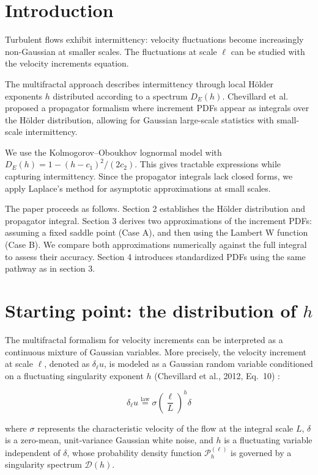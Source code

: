 \documentclass{article}
\begin{document}
\section{Introduction}

Turbulent flows exhibit intermittency: velocity fluctuations become increasingly non-Gaussian at smaller scales. The fluctuations at scale $\ell$ can be studied with the velocity increments equation.

The multifractal approach describes intermittency through local Hölder exponents $h$ distributed according to a spectrum $D_E(h)$. Chevillard et al.~\cite{chevillard2012} proposed a propagator formalism where increment PDFs appear as integrals over the Hölder distribution, allowing for Gaussian large-scale statistics with small-scale intermittency.

We use the Kolmogorov--Oboukhov lognormal model with $D_E(h) = 1 - (h-c_1)^2/(2c_2)$. This gives tractable expressions while capturing intermittency. Since the propagator integrals lack closed forms, we apply Laplace's method for asymptotic approximations at small scales.

The paper proceeds as follows. Section 2 establishes the Hölder distribution and propagator integral. Section 3 derives two approximations of the increment PDFs: assuming a fixed saddle point (Case A), and then using the Lambert W function (Case B). We compare both approximations numerically against the full integral to assess their accuracy. Section 4 introduces standardized PDFs using the same pathway as in section 3.

\section{Starting point: the distribution of $h$}

The multifractal formalism for velocity increments can be interpreted as a continuous mixture of Gaussian variables. More precisely, the velocity increment at scale $\ell$, denoted as $\delta_{\ell}u$, is modeled as a Gaussian random variable conditioned on a fluctuating singularity exponent $h$ (Chevillard et al., 2012, Eq.~10) :

\begin{equation}
\delta_{\ell}u \stackrel{\text{law}}{=} \sigma \left( \frac{\ell}{L} \right)^h \delta
\tag{0}
\end{equation}

where $\sigma$ represents the characteristic velocity of the flow at the integral scale $L$, $\delta$ is a zero-mean, unit-variance Gaussian white noise, and $h$ is a fluctuating variable independent of $\delta$, whose probability density function $\mathcal{P}_h^{(\ell)}$ is governed by a singularity spectrum $\mathcal{D}(h)$.
\end{document}
